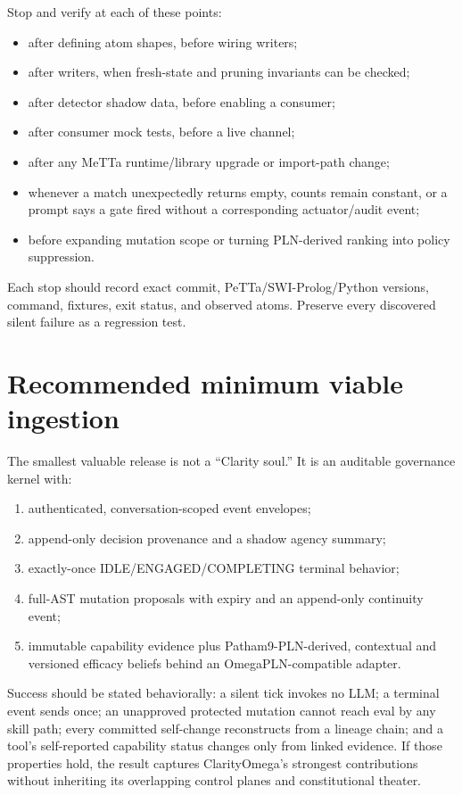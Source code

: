 \documentclass[11pt]{article}
\begin{document}
Stop and verify at each of these points:
\begin{itemize}
\item after defining atom shapes, before wiring writers;
\item after writers, when fresh-state and pruning invariants can be checked;
\item after detector shadow data, before enabling a consumer;
\item after consumer mock tests, before a live channel;
\item after any MeTTa runtime/library upgrade or import-path change;
\item whenever a match unexpectedly returns empty, counts remain constant, or a
prompt says a gate fired without a corresponding actuator/audit event;
\item before expanding mutation scope or turning PLN-derived ranking into policy
suppression.
\end{itemize}

Each stop should record exact commit, PeTTa/SWI-Prolog/Python versions, command,
fixtures, exit status, and observed atoms.  Preserve every discovered silent
failure as a regression test.

\section{Recommended minimum viable ingestion}

The smallest valuable release is not a ``Clarity soul.''  It is an auditable
governance kernel with:
\begin{enumerate}
\item authenticated, conversation-scoped event envelopes;
\item append-only decision provenance and a shadow agency summary;
\item exactly-once IDLE/ENGAGED/COMPLETING terminal behavior;
\item full-AST mutation proposals with expiry and an append-only continuity event;
\item immutable capability evidence plus Patham9-PLN-derived, contextual and
versioned efficacy beliefs behind an OmegaPLN-compatible adapter.
\end{enumerate}

Success should be stated behaviorally: a silent tick invokes no LLM; a terminal
event sends once; an unapproved protected mutation cannot reach eval by any skill
path; every committed self-change reconstructs from a lineage chain; and a tool's
self-reported capability status changes only from linked evidence.  If those
properties hold, the result captures ClarityOmega's strongest contributions
without inheriting its overlapping control planes and constitutional theater.
\end{document}
